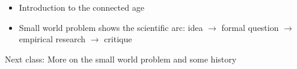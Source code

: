 \documentclass[aspectratio=169]{beamer}
\begin{document}
\begin{frame}

\begin{itemize}
\item Introduction to the connected age
\pause
\item Small world problem shows the scientific arc: idea $\rightarrow$ formal question $\rightarrow$ empirical research $\rightarrow$ critique
\end{itemize}

\end{frame}
\begin{frame}

Next class: More on the small world problem and some history

\end{frame}
\end{document}
